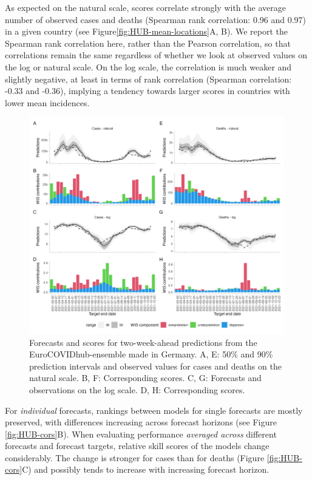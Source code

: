 \documentclass{article}
\begin{document}
As expected on the natural scale, scores correlate strongly with the average number of observed cases and deaths (Spearman rank correlation: 0.96 and 0.97) in a given country (see Figure\ref{fig:HUB-mean-locations}A, B). We report the Spearman rank correlation here, rather than the Pearson correlation, so that correlations remain the same regardless of whether we look at observed values on the log or natural scale. 
On the log scale, the correlation is much weaker and slightly negative, at least in terms of rank correlation (Spearman correlation: -0.33 and -0.36), implying a tendency towards larger scores in countries with lower mean incidences. 


\begin{figure}[h!]
    \centering
    \includegraphics[width=0.99\textwidth]{output/figures/HUB-model-comparison-ensemble.png}
    \caption{
    Forecasts and scores for two-week-ahead predictions from the EuroCOVIDhub-ensemble made in Germany. A, E: 50\% and 90\% prediction intervals and observed values for cases and deaths on the natural scale. B, F: Corresponding scores. C, G: Forecasts and observations on the log scale. D, H: Corresponding scores. 
    }
    \label{fig:HUB-model-comparison-ensemble}
\end{figure}


For \textit{individual} forecasts, rankings between models for single forecasts are mostly preserved, with differences increasing across forecast horizons (see Figure \ref{fig:HUB-cors}B). When evaluating performance \textit{averaged across} different forecasts and forecast targets, relative skill scores of the models change considerably. The change is stronger for cases than for deaths (Figure \ref{fig:HUB-cors}C) and possibly tends to increase with increasing forecast horizon. 
\end{document}

